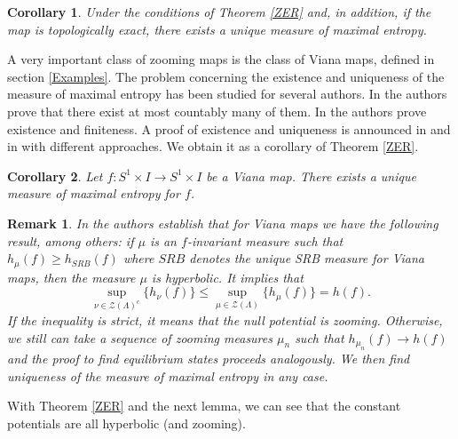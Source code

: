 \documentclass[12pt,a4paper]{amsart}
\theoremstyle{plain}
\newtheorem{remark}{Remark}[subsection]
\newtheorem{corollary}{Corollary}[subsection]
\begin{document}
\begin{corollary}\label{mme}
	Under the conditions of Theorem \ref{ZER} and, in addition, if the map is topologically exact, there exists a unique measure of maximal entropy. 
\end{corollary}
A very important class of zooming maps is the class of Viana maps, defined in  section \ref{Examples}. The problem concerning the existence and uniqueness of the measure of maximal entropy has been studied for several authors. In \cite{ALP} the authors prove that there exist at most countably many of them. In \cite{AOS} the authors prove existence and finiteness. A proof of existence and uniqueness is announced in \cite{PV} and in \cite{L}with different approaches. We obtain it as a corollary of Theorem \ref{ZER}.
\begin{corollary}
	Let $f:S^{1} \times I \to S^{1} \times I$ be a Viana map. There exists a unique measure of maximal entropy for $f$.
\end{corollary}

\begin{remark}
	In \cite[Proposition 12.2]{ALP} the authors establish that for Viana maps we have the following result, among others: if $\mu$ is an $f$-invariant measure such that $h_{\mu}(f) \geq h_{SRB}(f)$ where $SRB$ denotes the unique SRB measure for Viana maps, then the measure $\mu$ is hyperbolic. It implies that
	\[
	\sup_{\nu \in \mathcal{Z}(\Lambda)^{c}}\{h_{\nu}(f)\} \leq \sup_{\mu \in \mathcal{Z}(\Lambda)}\{h_{\mu}(f)\} = h(f).
	\]
	If the inequality is strict, it means that the null potential is zooming. Otherwise, we still can take a sequence of zooming measures $\mu_{n}$ such that $h_{\mu_{n}}(f) \to h(f)$ and the proof to find equilibrium states proceeds analogously. We then find uniqueness of the measure of maximal entropy in any case.
\end{remark}

With Theorem \ref{ZER} and the next lemma, we can see that the constant potentials are all hyperbolic (and zooming).
\end{document}
